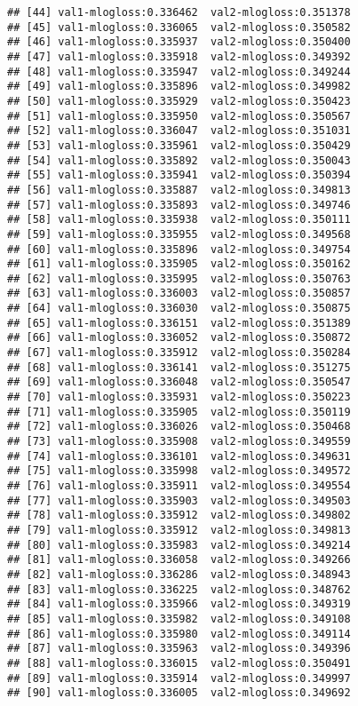 \documentclass[]{article}
\begin{document}
\begin{verbatim}
## [44] val1-mlogloss:0.336462  val2-mlogloss:0.351378 
## [45] val1-mlogloss:0.336065  val2-mlogloss:0.350582 
## [46] val1-mlogloss:0.335937  val2-mlogloss:0.350400 
## [47] val1-mlogloss:0.335918  val2-mlogloss:0.349392 
## [48] val1-mlogloss:0.335947  val2-mlogloss:0.349244 
## [49] val1-mlogloss:0.335896  val2-mlogloss:0.349982 
## [50] val1-mlogloss:0.335929  val2-mlogloss:0.350423 
## [51] val1-mlogloss:0.335950  val2-mlogloss:0.350567 
## [52] val1-mlogloss:0.336047  val2-mlogloss:0.351031 
## [53] val1-mlogloss:0.335961  val2-mlogloss:0.350429 
## [54] val1-mlogloss:0.335892  val2-mlogloss:0.350043 
## [55] val1-mlogloss:0.335941  val2-mlogloss:0.350394 
## [56] val1-mlogloss:0.335887  val2-mlogloss:0.349813 
## [57] val1-mlogloss:0.335893  val2-mlogloss:0.349746 
## [58] val1-mlogloss:0.335938  val2-mlogloss:0.350111 
## [59] val1-mlogloss:0.335955  val2-mlogloss:0.349568 
## [60] val1-mlogloss:0.335896  val2-mlogloss:0.349754 
## [61] val1-mlogloss:0.335905  val2-mlogloss:0.350162 
## [62] val1-mlogloss:0.335995  val2-mlogloss:0.350763 
## [63] val1-mlogloss:0.336003  val2-mlogloss:0.350857 
## [64] val1-mlogloss:0.336030  val2-mlogloss:0.350875 
## [65] val1-mlogloss:0.336151  val2-mlogloss:0.351389 
## [66] val1-mlogloss:0.336052  val2-mlogloss:0.350872 
## [67] val1-mlogloss:0.335912  val2-mlogloss:0.350284 
## [68] val1-mlogloss:0.336141  val2-mlogloss:0.351275 
## [69] val1-mlogloss:0.336048  val2-mlogloss:0.350547 
## [70] val1-mlogloss:0.335931  val2-mlogloss:0.350223 
## [71] val1-mlogloss:0.335905  val2-mlogloss:0.350119 
## [72] val1-mlogloss:0.336026  val2-mlogloss:0.350468 
## [73] val1-mlogloss:0.335908  val2-mlogloss:0.349559 
## [74] val1-mlogloss:0.336101  val2-mlogloss:0.349631 
## [75] val1-mlogloss:0.335998  val2-mlogloss:0.349572 
## [76] val1-mlogloss:0.335911  val2-mlogloss:0.349554 
## [77] val1-mlogloss:0.335903  val2-mlogloss:0.349503 
## [78] val1-mlogloss:0.335912  val2-mlogloss:0.349802 
## [79] val1-mlogloss:0.335912  val2-mlogloss:0.349813 
## [80] val1-mlogloss:0.335983  val2-mlogloss:0.349214 
## [81] val1-mlogloss:0.336058  val2-mlogloss:0.349266 
## [82] val1-mlogloss:0.336286  val2-mlogloss:0.348943 
## [83] val1-mlogloss:0.336225  val2-mlogloss:0.348762 
## [84] val1-mlogloss:0.335966  val2-mlogloss:0.349319 
## [85] val1-mlogloss:0.335982  val2-mlogloss:0.349108 
## [86] val1-mlogloss:0.335980  val2-mlogloss:0.349114 
## [87] val1-mlogloss:0.335963  val2-mlogloss:0.349396 
## [88] val1-mlogloss:0.336015  val2-mlogloss:0.350491 
## [89] val1-mlogloss:0.335914  val2-mlogloss:0.349997 
## [90] val1-mlogloss:0.336005  val2-mlogloss:0.349692 

\end{verbatim}
\end{document}
